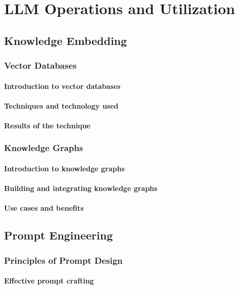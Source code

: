 \chapter{LLM Operations and Utilization}

\section{Knowledge Embedding}

\subsection{Vector Databases}
\subsubsection{Introduction to vector databases}
\subsubsection{Techniques and technology used}
\subsubsection{Results of the technique}

\subsection{Knowledge Graphs}
\subsubsection{Introduction to knowledge graphs}
\subsubsection{Building and integrating knowledge graphs}
\subsubsection{Use cases and benefits}

\section{Prompt Engineering}
\subsection{Principles of Prompt Design}
\subsubsection{Effective prompt crafting}
